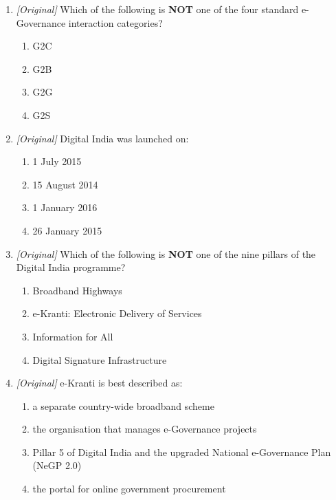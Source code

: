 \documentclass[11pt]{article}
\begin{document}
\begin{enumerate}[label=\textbf{Q\arabic*.}, leftmargin=*]
  government departments, is an example of:
  \begin{enumerate}[label=\Alph*.]
    \item G2C
    \item G2B
    \item G2G
    \item G2E
  \end{enumerate}
\item \textit{[Original]} Which of the following is \textbf{NOT} one of the
  four standard e-Governance interaction categories?
  \begin{enumerate}[label=\Alph*.]
    \item G2C
    \item G2B
    \item G2G
    \item G2S
  \end{enumerate}
\item \textit{[Original]} Digital India was launched on:
  \begin{enumerate}[label=\Alph*.]
    \item 1 July 2015
    \item 15 August 2014
    \item 1 January 2016
    \item 26 January 2015
  \end{enumerate}
\item \textit{[Original]} Which of the following is \textbf{NOT} one of the
  nine pillars of the Digital India programme?
  \begin{enumerate}[label=\Alph*.]
    \item Broadband Highways
    \item e-Kranti: Electronic Delivery of Services
    \item Information for All
    \item Digital Signature Infrastructure
  \end{enumerate}
\item \textit{[Original]} e-Kranti is best described as:
  \begin{enumerate}[label=\Alph*.]
    \item a separate country-wide broadband scheme
    \item the organisation that manages e-Governance projects
    \item Pillar 5 of Digital India and the upgraded National e-Governance
      Plan (NeGP 2.0)
    \item the portal for online government procurement

\end{enumerate}
\end{enumerate}
\end{document}
